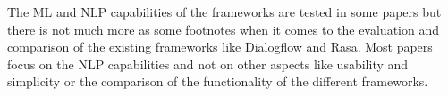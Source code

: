 The ML and NLP capabilities of the frameworks are tested in some papers but there is not much more as some footnotes when it 
comes to the evaluation and comparison of the existing frameworks like Dialogflow and Rasa.
Most papers focus on the NLP capabilities and not on other aspects like usability and simplicity or the comparison of the 
functionality of the different frameworks.



